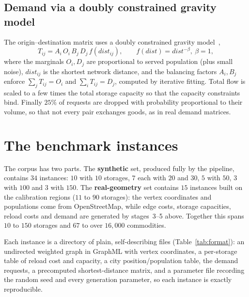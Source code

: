 \documentclass[11pt]{article}
\begin{document}
\subsection{Demand via a doubly constrained gravity model}
The origin--destination matrix uses a doubly constrained gravity
model~\cite{wilson1967},
\begin{equation}
T_{ij}=A_i\,O_i\,B_j\,D_j\,f(dist_{ij}), \qquad f(dist)=dist^{-\beta},\ \beta=1,
\end{equation}
where the marginals $O_i,D_j$ are proportional to served population (plus small
noise), $dist_{ij}$ is the shortest network distance, and the balancing factors
$A_i,B_j$ enforce $\sum_j T_{ij}=O_i$ and $\sum_i T_{ij}=D_j$, computed by
iterative fitting. Total flow is scaled to a few times the total storage
capacity so that the capacity constraints bind. Finally $25\%$ of requests are
dropped with probability proportional to their volume, so that not every pair
exchanges goods, as in real demand matrices.

\section{The benchmark instances}
\label{sec:benchmark}

The corpus has two parts. The \textbf{synthetic} set, produced fully by the
pipeline, contains $34$ instances: $10$ with $10$ storages, $7$ each with $20$
and $30$, $5$ with $50$, $3$ with $100$ and $3$ with $150$. The
\textbf{real-geometry} set contains $15$ instances built on the calibration
regions ($11$ to $90$ storages): the vertex coordinates and populations come from
OpenStreetMap, while edge costs, storage capacities, reload costs and demand are
generated by stages~3--5 above. Together this spans $10$ to $150$ storages and
$67$ to over $16{,}000$ commodities.

Each instance is a directory of plain, self-describing files
(Table~\ref{tab:format}): an undirected weighted graph in GraphML with vertex
coordinates, a per-storage table of reload cost and capacity, a city
position/population table, the demand requests, a precomputed shortest-distance
matrix, and a parameter file recording the random seed and every generation
parameter, so each instance is exactly reproducible.
\end{document}
